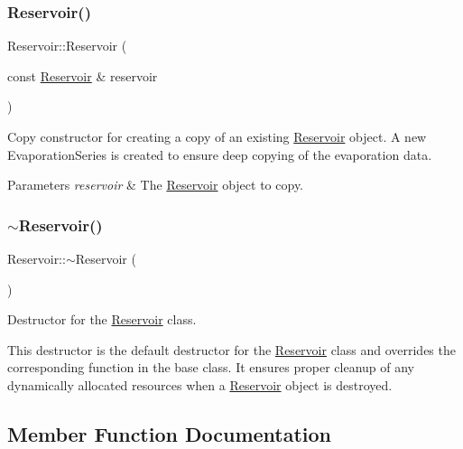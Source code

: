\subsubsection{\texorpdfstring{Reservoir()}{Reservoir()}\hspace{0.1cm}{\footnotesize\ttfamily [9/9]}}
{\footnotesize\ttfamily Reservoir\+::\+Reservoir (\begin{DoxyParamCaption}\item[{const \mbox{\hyperlink{classReservoir}{Reservoir}} \&}]{reservoir }\end{DoxyParamCaption})}



Copy constructor for creating a copy of an existing \mbox{\hyperlink{classReservoir}{Reservoir}} object. A new {\ttfamily Evaporation\+Series} is created to ensure deep copying of the evaporation data. 


\begin{DoxyParams}{Parameters}
{\em reservoir} & The {\ttfamily \mbox{\hyperlink{classReservoir}{Reservoir}}} object to copy. \\
\hline
\end{DoxyParams}
\mbox{\label{classReservoir_a2f8bfdc73c7470185775a940fb3531de}} 
\subsubsection{\texorpdfstring{$\sim$\+Reservoir()}{~Reservoir()}}
{\footnotesize\ttfamily Reservoir\+::$\sim$\+Reservoir (\begin{DoxyParamCaption}{ }\end{DoxyParamCaption})\hspace{0.3cm}{\ttfamily [override]}}



Destructor for the \mbox{\hyperlink{classReservoir}{Reservoir}} class. 

This destructor is the default destructor for the {\ttfamily \mbox{\hyperlink{classReservoir}{Reservoir}}} class and overrides the corresponding function in the base class. It ensures proper cleanup of any dynamically allocated resources when a {\ttfamily \mbox{\hyperlink{classReservoir}{Reservoir}}} object is destroyed. 

\subsection{Member Function Documentation}
\mbox{\label{classReservoir_a66929c055193785bc9d47bcdf0bc7445}} 
